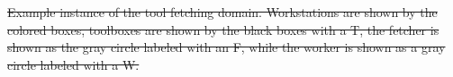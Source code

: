 \documentclass[letterpaper]{article}
\providecommand{\DIFdeltex}[1]{{\protect\color{red}\sout{#1}}}                      %
\providecommand{\DIFdelbegin}{} %
\providecommand{\DIFdelend}{} %
\providecommand{\DIFdelFL}[1]{\DIFdel{#1}} %
\providecommand{\DIFdel}[1]{\texorpdfstring{\DIFdeltex{#1}}{}} %
\newcommand{\DIFscaledelfig}{0.5}
\newlength{\DIFdelgraphicswidth} %
\newlength{\DIFdelgraphicsheight} %
\newcommand{\DIFdelincludegraphics}[2][]{%
\sbox{\DIFdelgraphicsbox}{\DIFOincludegraphics[#1]{#2}}%
\settoboxwidth{\DIFdelgraphicswidth}{\DIFdelgraphicsbox} %
\settoboxtotalheight{\DIFdelgraphicsheight}{\DIFdelgraphicsbox} %
\scalebox{\DIFscaledelfig}{%
\parbox[b]{\DIFdelgraphicswidth}{\usebox{\DIFdelgraphicsbox}\\[-\baselineskip] \rule{\DIFdelgraphicswidth}{0em}}\llap{\resizebox{\DIFdelgraphicswidth}{\DIFdelgraphicsheight}{%
\setlength{\unitlength}{\DIFdelgraphicswidth}%
\begin{picture}(1,1)%
\thicklines\linethickness{2pt} %
{\color[rgb]{1,0,0}\put(0,0){\framebox(1,1){}}}%
{\color[rgb]{1,0,0}\put(0,0){\line( 1,1){1}}}%
{\color[rgb]{1,0,0}\put(0,1){\line(1,-1){1}}}%
\end{picture}%
}\hspace*{3pt}}} %
} %
\DeclareRobustCommand{\DIFdelbegin}{\DIFOdelbegin \let\includegraphics\DIFdelincludegraphics} %
\DeclareRobustCommand{\DIFdelend}{\DIFOaddend \let\includegraphics\DIFOincludegraphics} %
\begin{document}





\DIFdelbegin %
{%
\DIFdelFL{Example instance of the tool fetching domain. Workstations are shown by the colored boxes, toolboxes are shown by the black boxes with a T, the fetcher is shown as the gray circle labeled with an F, while the worker is shown as a gray circle labeled with a W.}}

\DIFdelend %
\end{document}
